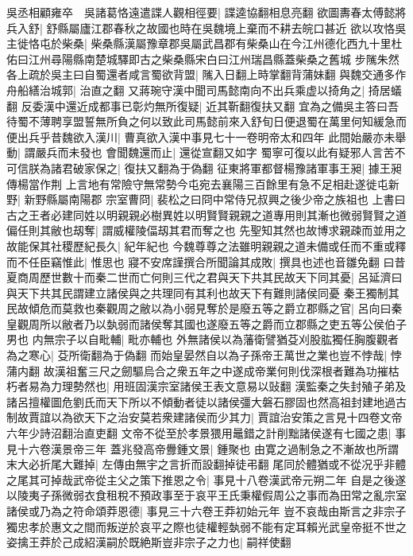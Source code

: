 吳丞相顧雍卒　吳諸葛恪遠遣諜人觀相徑要|{
	諜逵協翻相息亮翻}
欲圖夀春太傅懿將兵入舒|{
	舒縣屬廬江郡春秋之故國也時在吳魏境上棄而不耕去皖口甚近}
欲以攻恪吳主徙恪屯於柴桑|{
	柴桑縣漢屬豫章郡吳屬武昌郡有柴桑山在今江州德化西九十里杜佑曰江州尋陽縣南楚城驛即古之柴桑縣宋白曰江州瑞昌縣蓋柴桑之舊城}
步隲朱然各上疏於吳主曰自蜀還者咸言蜀欲背盟|{
	隲入日翻上時掌翻背蒲妹翻}
與魏交通多作舟船繕治城郭|{
	治直之翻}
又蔣琬守漢中聞司馬懿南向不出兵乘虚以掎角之|{
	掎居蟻翻}
反委漢中還近成都事已彰灼無所復疑|{
	近其靳翻復扶又翻}
宜為之備吳主答曰吾待蜀不薄聘享盟誓無所負之何以致此司馬懿前來入舒旬日便退蜀在萬里何知緩急而便出兵乎昔魏欲入漢川|{
	曹真欲入漢中事見七十一卷明帝太和四年}
此間始嚴亦未舉動|{
	謂嚴兵而未發也}
會聞魏還而止|{
	還從宣翻又如字}
蜀寧可復以此有疑邪人言苦不可信朕為諸君破家保之|{
	復扶又翻為于偽翻}
征東將軍都督楊豫諸軍事王昶|{
	據王昶傳楊當作荆}
上言地有常險守無常勢今屯宛去襄陽三百餘里有急不足相赴遂徙屯新野|{
	新野縣屬南陽郡}
宗室曹冏|{
	裴松之曰冏中常侍兄叔興之後少帝之族祖也}
上書曰古之王者必建同姓以明親親必樹異姓以明賢賢親親之道專用則其漸也微弱賢賢之道偏任則其敝也刼奪|{
	謂威權陵偪刼其君而奪之也}
先聖知其然也故博求親疎而並用之故能保其社稷歷紀長久|{
	紀年紀也}
今魏尊尊之法雖明親親之道未備或任而不重或釋而不任臣竊惟此|{
	惟思也}
寢不安席謹撰合所聞論其成敗|{
	撰具也述也音雛免翻}
曰昔夏商周歷世數十而秦二世而亡何則三代之君與天下共其民故天下同其憂|{
	呂延濟曰與天下共其民謂建立諸侯與之共理同有其利也故天下有難則諸侯同憂}
秦王獨制其民故傾危而莫救也秦觀周之敝以為小弱見奪於是廢五等之爵立郡縣之官|{
	呂向曰秦皇觀周所以敝者乃以埶弱而諸侯奪其國也遂廢五等之爵而立郡縣之吏五等公侯伯子男也}
内無宗子以自毗輔|{
	毗亦輔也}
外無諸侯以為藩衛譬猶芟刈股肱獨任胸腹觀者為之寒心|{
	芟所衛翻為于偽翻}
而始皇晏然自以為子孫帝王萬世之業也豈不悖哉|{
	悖蒲内翻}
故漢祖奮三尺之劒驅烏合之衆五年之中遂成帝業何則伐深根者難為功摧枯朽者易為力理勢然也|{
	用班固漢宗室諸侯王表文意易以䜴翻}
漢監秦之失封殖子弟及諸呂擅權圖危劉氏而天下所以不傾動者徒以諸侯彊大磐石膠固也然高祖封建地過古制故賈誼以為欲天下之治安莫若衆建諸侯而少其力|{
	賈誼治安策之言見十四卷文帝六年少詩沼翻治直吏翻}
文帝不從至於孝景猥用鼂錯之計削黜諸侯遂有七國之患|{
	事見十六卷漢景帝三年}
蓋兆發高帝釁鍾文景|{
	鍾聚也}
由寛之過制急之不漸故也所謂末大必折尾大難掉|{
	左傳由無宇之言折而設翻掉徒弔翻}
尾同於體猶或不從况乎非體之尾其可掉哉武帝從主父之策下推恩之令|{
	事見十八卷漢武帝元朔二年}
自是之後遂以陵夷子孫微弱衣食租稅不預政事至于哀平王氏秉權假周公之事而為田常之亂宗室諸侯或乃為之符命頌莽恩德|{
	事見三十六卷王莽初始元年}
豈不哀哉由斯言之非宗子獨忠孝於惠文之間而叛逆於哀平之際也徒權輕埶弱不能有定耳賴光武皇帝挺不世之姿擒王莽於己成紹漢嗣於既絶斯豈非宗子之力也|{
	嗣祥使翻}
